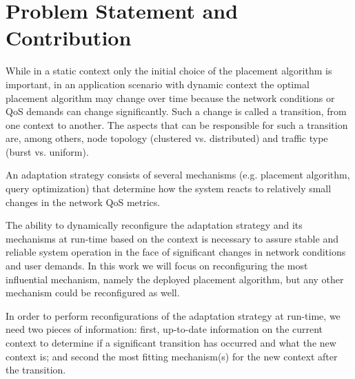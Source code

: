 \section{Problem Statement and Contribution}
While in a static context only the initial choice of the placement algorithm is important, in an application scenario with dynamic context the optimal placement algorithm may change over time because the network conditions or QoS demands can change significantly. Such a change is called a transition, from one context to another. The aspects that can be responsible for such a transition are, among others, node topology (clustered vs. distributed) and traffic type (burst vs. uniform). 

An adaptation strategy consists of several mechanisms (e.g. placement algorithm, query optimization) that determine how the system reacts to relatively small changes in the network QoS metrics.

The ability to dynamically reconfigure the adaptation strategy and its mechanisms at run-time based on the context is necessary to assure stable and reliable system operation in the face of significant changes in network conditions and user demands. 
In this work we will focus on reconfiguring the most influential mechanism, namely the deployed placement algorithm, but any other mechanism could be reconfigured as well. 


In order to perform reconfigurations of the adaptation strategy at run-time, we need two pieces of information: first, up-to-date information on the current context to determine if a significant transition has occurred and what the new context is; and second the most fitting mechanism(s) for the new context after the transition.
 

